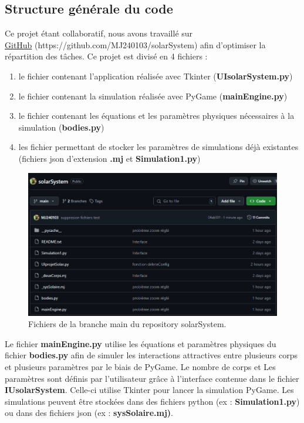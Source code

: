 \documentclass[a4paper, 12pt]{article}
\begin{document}
\subsection{Structure générale du code}
	Ce projet étant collaboratif, nous avons travaillé sur\\ \href{https://github.com/MJ240103/solarSystem}{GitHub} (https://github.com/MJ240103/solarSystem) afin d'optimiser la répartition des tâches. Ce projet est divisé en 4 fichiers : \\
    \begin{enumerate}
        \item le fichier contenant l'application réalisée avec Tkinter (\textbf{UIsolarSystem.py})
        \item le fichier contenant la simulation réalisée avec PyGame (\textbf{mainEngine.py})
        \item le fichier contenant les équations et les paramètres physiques nécessaires à la simulation (\textbf{bodies.py})
        \item les fichier permettant de stocker les paramètres de simulations déjà existantes (fichiers json d'extension \textbf{.mj} et \textbf{Simulation1.py})
    \end{enumerate}
    \begin{figure}[H]
        \centering
        \includegraphics[width=0.45\linewidth]{img/imgGitHub.png}
        \caption{\label{fig:Git}Fichiers de la branche main du repository solarSystem.}
    \end{figure} 
     
	Le fichier \textbf{mainEngine.py} utilise les équations et paramètres physiques du fichier \textbf{bodies.py} afin de simuler les interactions attractives entre plusieurs corps et plusieurs paramètres par le biais de PyGame. Le nombre de corps et Les paramètres sont définis par l'utilisateur grâce à l'interface contenue dans le fichier \textbf{IUsolarSystem}. Celle-ci utilise Tkinter pour lancer la simulation PyGame. Les simulations peuvent être stockées dans des fichiers python (ex : \textbf{Simulation1.py}) ou dans des fichiers json (ex : \textbf{sysSolaire.mj)}.
%
%
%
\newpage
\end{document}
